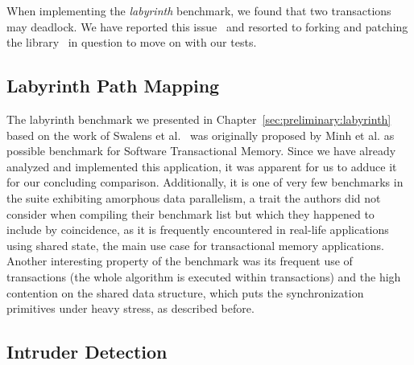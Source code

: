When implementing the \emph{labyrinth} benchmark, we found that two transactions may deadlock.
We have reported this issue~\cite{wittwer2020stmissue} and resorted to forking and patching the library~\cite{wittwer2020stm} in question to move on with our tests.


\subsection{Labyrinth Path Mapping}
\label{sec:experiments:labyrinth}

The labyrinth benchmark we presented in Chapter~\ref{sec:preliminary:labyrinth} based on the work of Swalens et al.~\cite{swalens2016transactional} was originally proposed by Minh et al. as possible benchmark for Software Transactional Memory.
Since we have already analyzed and implemented this application, it was apparent for us to adduce it for our concluding comparison.
Additionally, it is one of very few benchmarks in the suite exhibiting amorphous data parallelism, a trait the authors did not consider when compiling their benchmark list but which they happened to include by coincidence, as it is frequently encountered in real-life applications using shared state, the main use case for transactional memory applications.
Another interesting property of the benchmark was its frequent use of transactions (the whole algorithm is executed within transactions) and the high contention on the shared data structure, which puts the synchronization primitives under heavy stress, as described before.



\subsection{Intruder Detection}
\label{sec:experiments:intruder}

